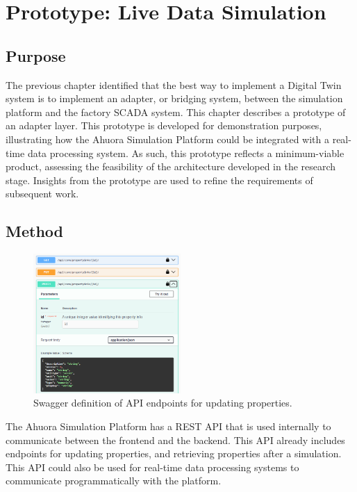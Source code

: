 \chapter{Prototype: Live Data Simulation} \label{sec:simulationprototype}

\section{Purpose}

The previous chapter identified that the best way to implement a Digital Twin system is to implement an adapter, or bridging system, between the simulation platform and the factory SCADA system. This chapter describes a prototype of an adapter layer.
This prototype is developed for demonstration purposes, illustrating how the Ahuora Simulation Platform could be integrated with a real-time data processing system. As such, this prototype reflects a minimum-viable product, assessing the feasibility of the architecture developed in the research stage. Insights from the prototype are used to refine the requirements of subsequent work.

\section{Method}

\begin{figure}
    \centering
    \includegraphics[width=0.5\textwidth]{swaggerprops.png}
    \caption{Swagger definition of API endpoints for updating properties.}
    \label{fig:swaggerendpoints}
\end{figure}

The Ahuora Simulation Platform has a REST API that is used internally to communicate between the frontend and the backend. This API already includes endpoints for updating properties, and retrieving properties after a simulation. This API could also be used for real-time data processing systems to communicate programmatically with the platform.


